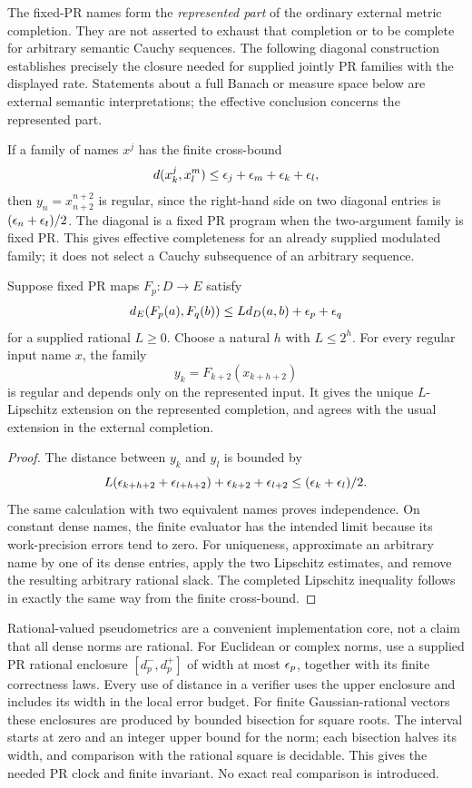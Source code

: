 The fixed-PR names form the \emph{represented part} of the ordinary external metric completion. They are not asserted to exhaust that completion or to be complete for arbitrary semantic Cauchy sequences. The following diagonal construction establishes precisely the closure needed for supplied jointly PR families with the displayed rate. Statements about a full Banach or measure space below are external semantic interpretations; the effective conclusion concerns the represented part.

If a family of names $x^j$ has the finite cross-bound
\[
 d(x^j_k,x^m_l)\le\epsilon_j+\epsilon_m+\epsilon_k+\epsilon_l,
\]
then $y_n=x^{n+2}_{n+2}$ is regular, since the right-hand side on two diagonal entries is $(\epsilon_n+\epsilon_t)/2$. The diagonal is a fixed PR program when the two-argument family is fixed PR. This gives effective completeness for an already supplied modulated family; it does not select a Cauchy subsequence of an arbitrary sequence.

\begin{theorem}\label{thm:extension}
Suppose fixed PR maps $F_p:D\to E$ satisfy
\[
 d_E(F_p(a),F_q(b))\le Ld_D(a,b)+\epsilon_p+\epsilon_q
\]
for a supplied rational $L\ge0$. Choose a natural $h$ with $L\le2^h$. For every regular input name $x$, the family
\[
 y_k=F_{k+2}(x_{k+h+2})
\]
is regular and depends only on the represented input. It gives the unique $L$-Lipschitz extension on the represented completion, and agrees with the usual extension in the external completion.
\end{theorem}
\begin{proof}
The distance between $y_k$ and $y_l$ is bounded by
\[
 L(\epsilon_{k+h+2}+\epsilon_{l+h+2})+\epsilon_{k+2}+\epsilon_{l+2}
 \le (\epsilon_k+\epsilon_l)/2.
\]
The same calculation with two equivalent names proves independence. On constant dense names, the finite evaluator has the intended limit because its work-precision errors tend to zero. For uniqueness, approximate an arbitrary name by one of its dense entries, apply the two Lipschitz estimates, and remove the resulting arbitrary rational slack. The completed Lipschitz inequality follows in exactly the same way from the finite cross-bound.
\end{proof}

Rational-valued pseudometrics are a convenient implementation core, not a claim that all dense norms are rational. For Euclidean or complex norms, use a supplied PR rational enclosure $[d^-_p,d^+_p]$ of width at most $\epsilon_p$, together with its finite correctness laws. Every use of distance in a verifier uses the upper enclosure and includes its width in the local error budget. For finite Gaussian-rational vectors these enclosures are produced by bounded bisection for square roots. The interval starts at zero and an integer upper bound for the norm; each bisection halves its width, and comparison with the rational square is decidable. This gives the needed PR clock and finite invariant. No exact real comparison is introduced.

